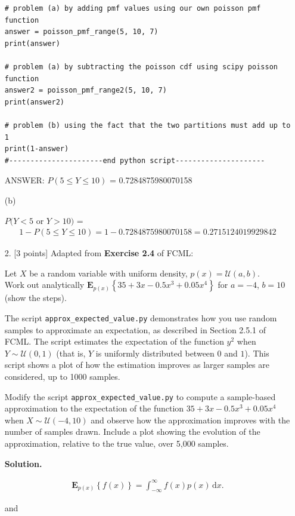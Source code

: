 \documentclass[10pt]{article}
\begin{document}
\begin{itemize}
\begin{verbatim}
# problem (a) by adding pmf values using our own poisson pmf function
answer = poisson_pmf_range(5, 10, 7)
print(answer)

# problem (a) by subtracting the poisson cdf using scipy poisson function
answer2 = poisson_pmf_range2(5, 10, 7)
print(answer2)

# problem (b) using the fact that the two partitions must add up to 1
print(1-answer)
#----------------------end python script---------------------
\end{verbatim}

ANSWER: $P(5 \leq Y \leq 10)$ = 0.7284875980070158

(b)

$P(Y < 5$ or $Y > 10)$ =
\begin{align*}
    1 - P(5 \leq Y \leq 10) = 1 - 0.7284875980070158 = 0.2715124019929842
\end{align*}

\item[2.] [3 points]
Adapted from {\bf Exercise 2.4} of FCML:

Let $X$ be a random variable with uniform density, $p(x) = \mathcal{U}(a,b)$.  \\
Work out analytically $\mathbf{E}_{p(x)} \left\{ 35 + 3x - 0.5x^3 + 0.05x^4 \right\}$ for $a=-4$, $b=10$ (show the steps).  

The script {\tt approx\_expected\_value.py} demonstrates how you use random samples to approximate an expectation, as described in Section 2.5.1 of FCML.  The script estimates the expectation of the function $y^2$ when $Y \sim \mathcal{U}(0,1)$ (that is, $Y$ is uniformly distributed between $0$ and $1$).  This script shows a plot of how the estimation improves as larger samples are considered, up to 1000 samples.

Modify the script {\tt approx\_expected\_value.py} to compute a sample-based approximation to the expectation of the function $35 + 3x - 0.5x^3 + 0.05x^4$ when $X \sim \mathcal{U}(-4,10)$ and observe how the approximation improves with the number of samples drawn.  Include a plot showing the evolution of the approximation, relative to the true value, over 5,000 samples.

{\bf Solution.}

\begin{align*}
    \mathbf{E}_{p(x)} \left\{ f(x) \right\}  = \int_{-\infty}^{\infty} \! f(x)p(x) \, \mathrm{d}x.
\end{align*}

and 


\end{itemize}
\end{document}
